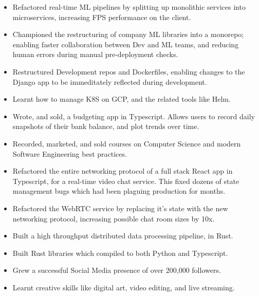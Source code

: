 \documentclass{jcgcv}
\begin{document}
\begin{column}
  \begin{itemize}
    \item Refactored real-time ML pipelines by splitting up monolithic services
          into microservices, increasing FPS performance on the client.
    \item Championed the restructuring of company ML libraries into a
          monorepo; enabling faster collaboration between Dev and ML teams,
          and reducing human errors during manual pre-deployment checks.
    \item Restructured Development repos and Dockerfiles, enabling changes to
          the Django app to be immeditately reflected during development.
    \item Learnt how to manage K8S on GCP, and the related tools like Helm.
  \end{itemize}

  \begin{itemize}
    \item Wrote, and sold, a budgeting app in Typescript. Allows users to record
          daily snapshots of their bank balance, and plot trends over time.
    \item Recorded, marketed, and sold courses on Computer Science and
          modern Software Engineering best practices.
  \end{itemize}

  \begin{itemize}
    \item Refactored the entire networking protocol of a full stack React app in
          Typescript, for a real-time video chat service. This fixed dozens of
          state management bugs which had been plaguing production for months.
    \item Refactored the WebRTC service by replacing it's state with the new
          networking protocol, increasing possible chat room sizes by 10x.
    \item Built a high throughput distributed data processing pipeline, in Rust.
    \item Built Rust libraries which compiled to both Python and Typescript.
  \end{itemize}

  \begin{itemize}
    \item Grew a successful Social Media presence of over 200,000 followers.
    \item Learnt creative skills like digital art, video editing, and live streaming.
  \end{itemize}


\end{column}
\end{document}
